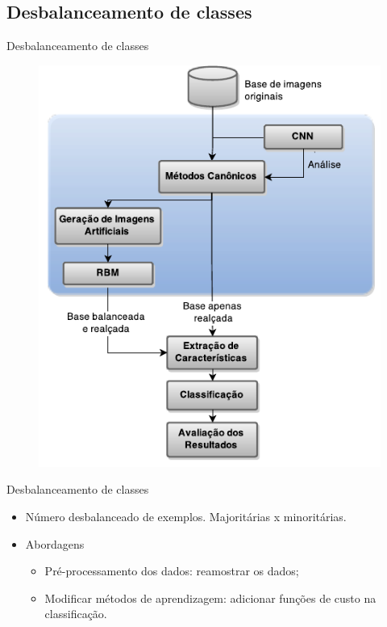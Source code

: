 \documentclass{beamer}
\begin{document}
\subsection{Desbalanceamento de classes}
\begin{frame}{Desbalanceamento de classes}
\begin{figure}
    \includegraphics[height=0.75\textheight]{figuras/geral.pdf}
\end{figure}
\end{frame}
\begin{frame}{Desbalanceamento de classes}
\setlength\leftmargini{0em}
\justifying
{}
\begin{itemize}
  \item Número desbalanceado de exemplos. Majoritárias x minoritárias.
  \item Abordagens
    \begin{itemize}
        \item Pré-processamento dos dados: reamostrar os dados;
        \item Modificar métodos de aprendizagem: adicionar funções de custo na classificação.
    \end{itemize}
\end{itemize}
\end{frame}
\end{document}
